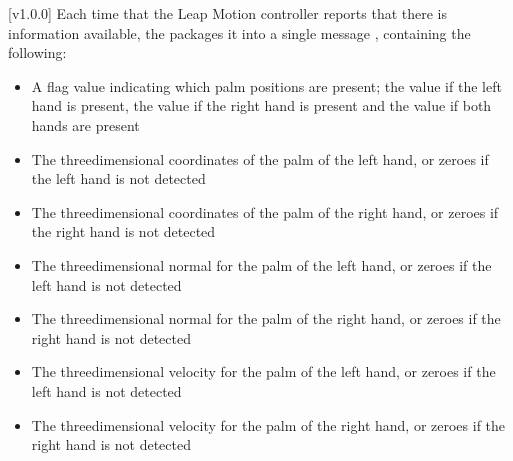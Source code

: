 [v1.0.0]
Each time that the Leap Motion controller reports that there is information available,
the  packages it into a single message
\openSq{}\closeSq, containing the following:
\begin{itemize}
\item A flag value indicating which palm positions are present; the value  if
the left hand is present, the value  if the right hand is present and the value
 if both hands are present
\item\exSp{}The three\longDash{}dimensional coordinates of the palm of the left hand, or
zeroes if the left hand is not detected
\item\exSp{}The three\longDash{}dimensional coordinates of the palm of the right hand, or
zeroes if the right hand is not detected
\item\exSp{}The three\longDash{}dimensional normal for the palm of the left hand, or
zeroes if the left hand is not detected
\item\exSp{}The three\longDash{}dimensional normal for the palm of the right hand, or
zeroes if the right hand is not detected
\item\exSp{}The three\longDash{}dimensional velocity for the palm of the left hand, or
zeroes if the left hand is not detected
\item\exSp{}The three\longDash{}dimensional velocity for the palm of the right hand, or
zeroes if the right hand is not detected
\end{itemize}
\appendixEnd{}
